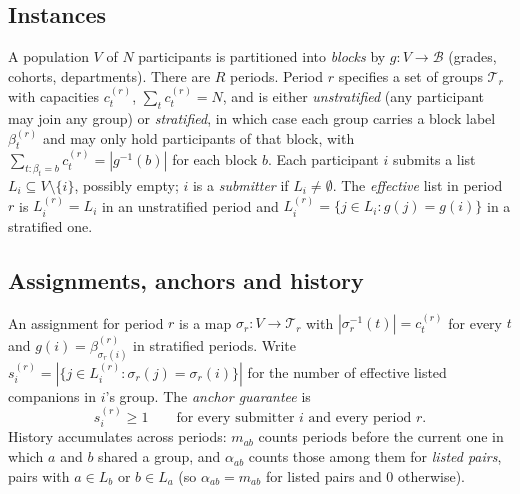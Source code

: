\documentclass[11pt,a4paper]{article}
\theoremstyle{plain}
\theoremstyle{definition}
\theoremstyle{remark}
\begin{document}
\subsection{Instances}
A population $V$ of $N$ participants is partitioned into \emph{blocks} by $g : V \to \mathcal{B}$ (grades, cohorts, departments). There are $R$ periods. Period $r$ specifies a set of groups $\mathcal{T}_r$ with capacities $c^{(r)}_t$, $\sum_t c^{(r)}_t = N$, and is either \emph{unstratified} (any participant may join any group) or \emph{stratified}, in which case each group carries a block label $\beta^{(r)}_t$ and may only hold participants of that block, with $\sum_{t : \beta_t = b} c^{(r)}_t = |g^{-1}(b)|$ for each block $b$. Each participant $i$ submits a list $L_i \subseteq V \setminus \{i\}$, possibly empty; $i$ is a \emph{submitter} if $L_i \neq \emptyset$. The \emph{effective} list in period $r$ is $L^{(r)}_i = L_i$ in an unstratified period and $L^{(r)}_i = \{ j \in L_i : g(j) = g(i)\}$ in a stratified one.

\subsection{Assignments, anchors and history}
An assignment for period $r$ is a map $\sigma_r : V \to \mathcal{T}_r$ with $|\sigma_r^{-1}(t)| = c^{(r)}_t$ for every $t$ and $g(i) = \beta^{(r)}_{\sigma_r(i)}$ in stratified periods. Write $s^{(r)}_i = |\{ j \in L^{(r)}_i : \sigma_r(j) = \sigma_r(i) \}|$ for the number of effective listed companions in $i$'s group. The \emph{anchor guarantee} is
\begin{equation}
s^{(r)}_i \ge 1 \qquad \text{for every submitter } i \text{ and every period } r. \label{eq:anchor}
\end{equation}
History accumulates across periods: $m_{ab}$ counts periods before the current one in which $a$ and $b$ shared a group, and $\alpha_{ab}$ counts those among them for \emph{listed pairs}, pairs with $a \in L_b$ or $b \in L_a$ (so $\alpha_{ab} = m_{ab}$ for listed pairs and $0$ otherwise).
\end{document}
